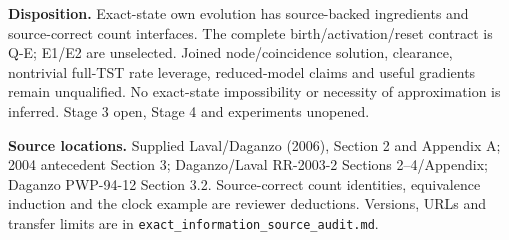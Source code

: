 \documentclass[11pt,a4paper]{article}
\begin{document}
\textbf{Disposition.} Exact-state own evolution has source-backed ingredients
and source-correct count interfaces. The complete birth/activation/reset contract
is Q-E; E1/E2 are unselected. Joined node/coincidence solution, clearance,
nontrivial full-TST rate leverage, reduced-model claims and useful gradients
remain unqualified. No exact-state impossibility or necessity of approximation
is inferred. Stage 3 open, Stage 4 and experiments unopened.

\textbf{Source locations.} Supplied Laval/Daganzo (2006), Section 2 and Appendix
A; 2004 antecedent Section 3; Daganzo/Laval RR-2003-2 Sections 2--4/Appendix;
Daganzo PWP-94-12 Section 3.2. Source-correct count identities, equivalence
induction and the clock example are reviewer deductions. Versions, URLs and
transfer limits are in \texttt{exact\_information\_source\_audit.md}.
\end{document}
